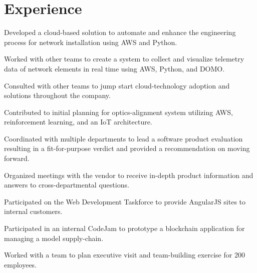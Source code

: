 \documentclass[]{deedy-resume-reversed}
\begin{document}
%
%

%
%

%
%

\begin{minipage}[t]{0.60\textwidth}


\section{Experience}
\vspace{\topsep} %
\begin{tightemize}
\item Developed a cloud-based solution to automate and enhance the engineering process for network installation using AWS and Python.
\item Worked with other teams to create a system to collect and visualize telemetry data of network elements in real time using AWS, Python, and DOMO.
\item Consulted with other teams to jump start cloud-technology adoption and solutions throughout the company.
\item Contributed to initial planning for optics-alignment system utilizing AWS, reinforcement learning, and an IoT architecture.
\end{tightemize}
\sectionsep

\begin{tightemize}
\item Coordinated with multiple departments to lead a software product evaluation resulting in a fit-for-purpose verdict and provided a recommendation on moving forward.
\item Organized meetings with the vendor to receive in-depth product information and answers to cross-departmental questions.
\item Participated on the Web Development Taskforce to provide AngularJS sites to internal customers.
\item Participated in an internal CodeJam to prototype a blockchain application for managing a model supply-chain.
\item Worked with a team to plan executive visit and team-building exercise for 200 employees.
\end{tightemize}
\sectionsep


\end{minipage}
\end{document}
